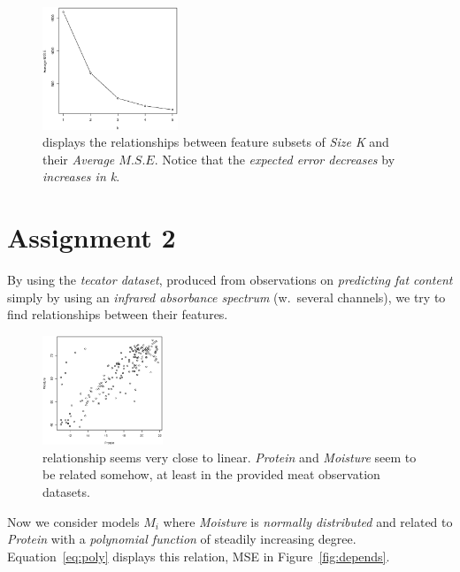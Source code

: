 \documentclass[a4paper, twocolumn]{article}
\begin{document}
    \begin{figure}[h!]
        \centering
        \label{fig:kvsmse}
        \caption{displays the relationships between feature subsets of \emph{Size K} and their \emph{Average $M.S.E$}. Notice that the \emph{expected error decreases} by \emph{increases in k}.}
        \includegraphics[width=0.36\textwidth]
        {share/kvsmse.eps}
    \end{figure}

    \newpage

    \section*{Assignment 2}

    By using the \emph{tecator dataset}, produced from observations on \emph{predicting fat content} simply by using an \emph{infrared absorbance spectrum} (w.\ several channels), we try to find relationships between their features.

    \begin{figure}[h!]
        \centering
        \caption{relationship seems very close to linear. \emph{Protein} and \emph{Moisture} seem to be related somehow, at least in the provided meat observation datasets.}
        \label{fig:linear}
        \includegraphics[width=0.32\textwidth]
        {share/linear.eps}
    \end{figure}

    Now we consider models $M_i$ where \emph{Moisture} is \emph{normally distributed} and related to \emph{Protein} with a \emph{polynomial function} of steadily increasing degree. Equation~\ref{eq:poly} displays this relation, MSE in Figure~\ref{fig:depends}.
\end{document}
